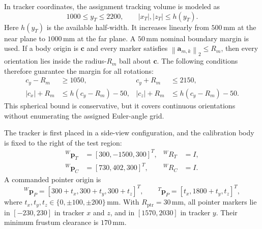 \documentclass[11pt]{article}
\newcommand{\vct}[1]{\bm{#1}}
\newcommand{\norm}[1]{\left\|#1\right\|_2}
\begin{document}
In tracker coordinates, the assignment tracking volume is modeled as
\begin{equation}
1000\leq y_T\leq2200,\qquad
|x_T|,|z_T|\leq h(y_T).
\label{eq:tracking-frustum}
\end{equation}
Here $h(y_T)$ is the available half-width.  It increases linearly from
$500\,\mathrm{mm}$ at the near plane to $1000\,\mathrm{mm}$ at the far plane.
A $50\,\mathrm{mm}$ nominal boundary margin is used.  If a body origin is
$\vct c$ and every marker satisfies $\norm{\vct a_{m,k}}\leq R_m$, then every
orientation lies inside the radius-$R_m$ ball about $\vct c$.  The following
conditions therefore guarantee the margin for all rotations:
\begin{equation}
\boxed{
\begin{aligned}
c_y-R_m&\geq1050,& c_y+R_m&\leq2150,\\
|c_x|+R_m&\leq h(c_y-R_m)-50,&
|c_z|+R_m&\leq h(c_y-R_m)-50.
\end{aligned}}
\label{eq:workspace-envelope}
\end{equation}
This spherical bound is conservative, but it covers continuous orientations
without enumerating the assigned Euler-angle grid.

The tracker is first placed in a side-view configuration, and the calibration
body is fixed to the right of the test region:
\begin{equation}
\boxed{
\begin{aligned}
{}^W\vct p_T&=[300,-1500,300]^T,& {}^WR_T&=I,\\
{}^W\vct p_C&=[730,402,300]^T,& {}^WR_C&=I.
\end{aligned}}
\label{eq:tracker-cal-placement}
\end{equation}
A commanded pointer origin is
\begin{equation}
{}^W\vct p_P=[300+t_x,300+t_y,300+t_z]^T,
\qquad
{}^T\vct p_P=[t_x,1800+t_y,t_z]^T,
\end{equation}
where $t_x,t_y,t_z\in\{0,\pm100,\pm200\}\,\mathrm{mm}$.  With
$R_{\mathrm{ptr}}=30\,\mathrm{mm}$, all pointer markers lie in
$[-230,230]$ in tracker $x$ and $z$, and in $[1570,2030]$ in tracker $y$.
Their minimum frustum clearance is $170\,\mathrm{mm}$.
\end{document}
